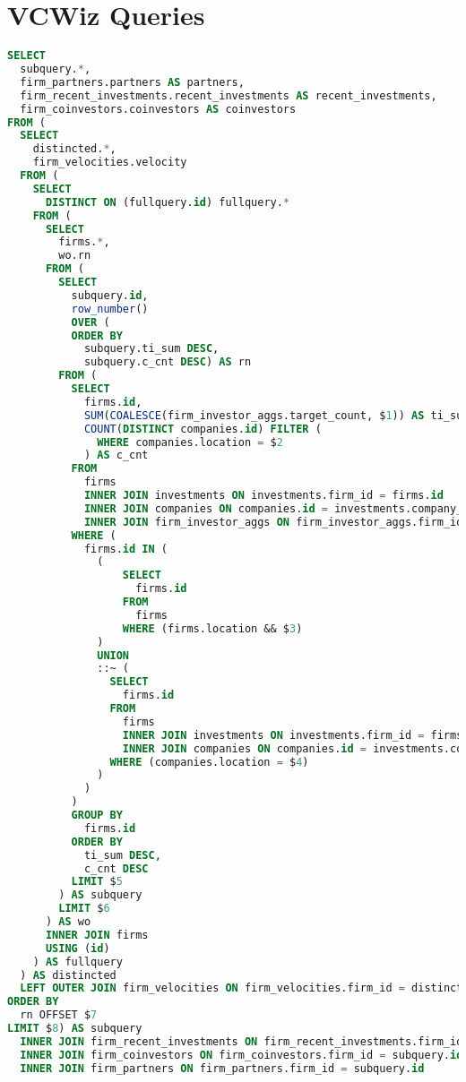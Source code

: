 \chapter{VCWiz Queries}

\begin{lstlisting}[frame=single,language=SQL,basicstyle=\footnotesize,columns=fullflexible,label={vcwiz:sql:query},caption={Firm Filter Query}]
SELECT
  subquery.*,
  firm_partners.partners AS partners,
  firm_recent_investments.recent_investments AS recent_investments,
  firm_coinvestors.coinvestors AS coinvestors
FROM (
  SELECT
    distincted.*,
    firm_velocities.velocity
  FROM (
    SELECT
      DISTINCT ON (fullquery.id) fullquery.*
    FROM (
      SELECT
        firms.*,
        wo.rn
      FROM (
        SELECT
          subquery.id,
          row_number()
          OVER (
          ORDER BY
            subquery.ti_sum DESC,
            subquery.c_cnt DESC) AS rn
        FROM (
          SELECT
            firms.id,
            SUM(COALESCE(firm_investor_aggs.target_count, $1)) AS ti_sum,
            COUNT(DISTINCT companies.id) FILTER (
              WHERE companies.location = $2
            ) AS c_cnt
          FROM
            firms
            INNER JOIN investments ON investments.firm_id = firms.id
            INNER JOIN companies ON companies.id = investments.company_id
            INNER JOIN firm_investor_aggs ON firm_investor_aggs.firm_id = firms.id
          WHERE (
            firms.id IN (
              (
                  SELECT
                    firms.id
                  FROM
                    firms
                  WHERE (firms.location && $3)
              )
              UNION
              ::~ (
                SELECT
                  firms.id
                FROM
                  firms
                  INNER JOIN investments ON investments.firm_id = firms.id
                  INNER JOIN companies ON companies.id = investments.company_id
                WHERE (companies.location = $4)
              )
            )
          )
          GROUP BY
            firms.id
          ORDER BY
            ti_sum DESC,
            c_cnt DESC
          LIMIT $5
        ) AS subquery
        LIMIT $6
      ) AS wo
      INNER JOIN firms
      USING (id)
    ) AS fullquery
  ) AS distincted
  LEFT OUTER JOIN firm_velocities ON firm_velocities.firm_id = distincted.id
ORDER BY
  rn OFFSET $7
LIMIT $8) AS subquery
  INNER JOIN firm_recent_investments ON firm_recent_investments.firm_id = subquery.id
  INNER JOIN firm_coinvestors ON firm_coinvestors.firm_id = subquery.id
  INNER JOIN firm_partners ON firm_partners.firm_id = subquery.id
\end{lstlisting}

